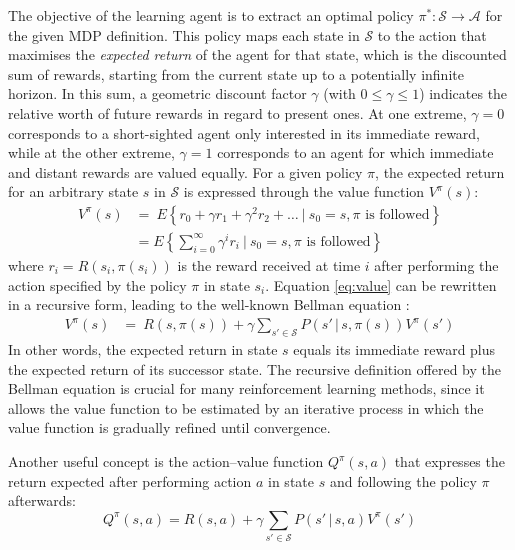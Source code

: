 The objective of the learning agent is to extract an optimal policy $\pi^*: \mathcal{S} \rightarrow \mathcal{A}$ for the given MDP definition. This policy maps each state in $\mathcal{S}$ to the action that maximises the \textit{expected return} of the agent for that state, which is the discounted sum of rewards, starting from the current state up to a potentially infinite horizon.  In this sum, a geometric discount factor $\gamma$ (with $0 \leq \gamma \leq 1$) indicates the relative worth of future rewards in regard to present ones. At one extreme, $\gamma = 0$ corresponds to a short-sighted agent only interested in its immediate reward, while at the other extreme, $\gamma=1$ corresponds to an agent for which immediate and distant rewards are valued equally. For a given policy $\pi$, the expected return for an arbitrary state $s$ in $\mathcal{S}$ is expressed through the value function $V^{\pi}(s)$:
\begin{align}
V^{\pi}(s) & = \  E \left\{ r_0 + \gamma r_1 + \gamma^2 r_2 + \dots \ \big| \ s_0 = s, \pi \text{ is followed} \right\} \\
& = E \left\{\sum_{i=0}^{\infty}  \gamma^i r_{i} \ \bigg| \ s_0 = s, \pi \text{ is followed} \right\} \label{eq:value}
\end{align} 
where $r_i = R(s_i, \pi(s_i))$ is the reward received at time $i$ after performing the action specified by the policy $\pi$  in state $s_i$.  Equation \eqref{eq:value}  can be rewritten in a recursive form, leading to the well-known Bellman equation \citep{Bellman:1957}:
\begin{align}
V^{\pi}(s) & = \    R(s, \pi(s)) + \gamma  \sum_{s' \in \mathcal{S}} P(s'\, | \, s,\pi(s)) V^{\pi}(s') \label{eq:bellman}
\end{align} 
In other words, the expected return in state $s$ equals its immediate reward plus the expected return of its successor state.  The recursive definition offered by the Bellman equation is crucial for many reinforcement learning methods, since it allows the value function to be estimated by an iterative process in which the value function is gradually refined until convergence.

Another useful concept is the action--value function $Q^{\pi}(s,a)$ that expresses the return expected after performing action $a$ in state $s$ and following the policy $\pi$ afterwards:
\begin{equation}
Q^{\pi}(s,a) = R(s,a) + \gamma  \sum_{s' \in \mathcal{S}} P(s'\, | \, s,a) V^{\pi}(s')
\end{equation}

